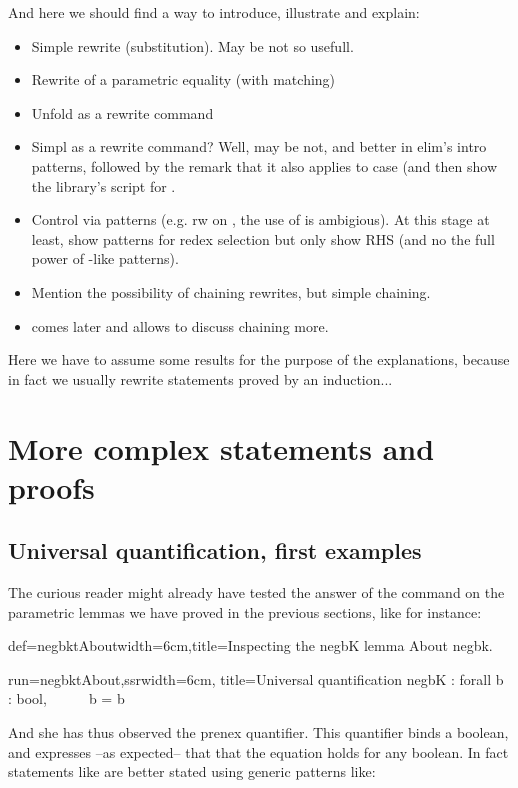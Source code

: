 And here we should find a way to introduce, illustrate and explain:
\begin{itemize}
\item Simple rewrite (substitution). May be not so usefull.
\item Rewrite of a parametric equality (with matching)
\item Unfold as a rewrite command
\item Simpl as a rewrite command? Well, may be not, and better in
  elim's intro patterns, followed by the remark that it also applies
  to case (and then show the library's script for .
\item Control via patterns (e.g. rw  on
, the use of  is ambigious). At this
stage at least, show patterns for redex selection but only show RHS
(and no the full power of \C{[X in _ <= X]}-like patterns).
\item Mention the possibility of chaining rewrites, but simple chaining.
\item {} comes later and allows to discuss chaining more.
\end{itemize}

Here we have to assume some results for the purpose of the
explanations, because in fact we usually rewrite statements proved by
an induction...

\section{More complex statements and proofs}

\subsection{Universal quantification, first examples}
The curious reader might already have tested the answer of the
 command on the parametric lemmas we have proved in the
previous sections, like for instance:

\begin{coq}{def=negbktAbout}{width=6cm,title=Inspecting the negbK lemma}
About negbk.
\end{coq}
\begin{coqout}{run=negbktAbout,ssr}{width=6cm, title=Universal quantification}
negbK : forall b : bool, ~~ ~~ b = b
\end{coqout}

And she has thus observed the prenex  quantifier. This
quantifier binds a boolean, and expresses --as expected-- that that
the equation holds for any boolean. In fact statements like 
are better stated using generic patterns like:

